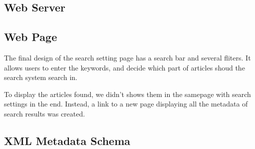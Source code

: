 \subsection{Web Server}

\subsection{Web Page}
The final design of the search setting page has a search bar and several fliters.
It allows users to enter the keywords, and decide which part of articles shoud the search system search in.

To display the articles found, we didn't shows them in the samepage with search settings in the end. Instead, a link to a new page displaying all the metadata of search results was created.
\subsection{XML Metadata Schema}